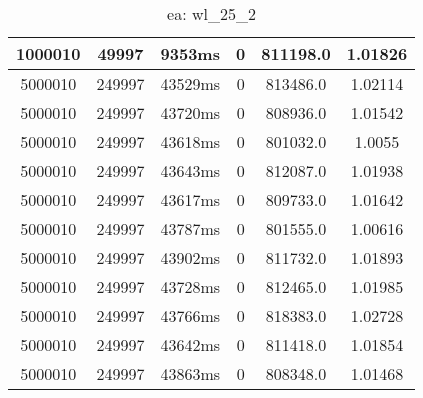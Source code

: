 \documentclass[./main.tex]{subfiles}
\begin{document}
\begin{table}
\begin{tabular}{ c | c | c | c | c | c }
        \rowcolor{lightgray} 1000010 & 49997 & 9353ms & 0 & 811198.0 & 1.01826 \\
        \hline
        5000010 & 249997 & 43529ms & 0 & 813486.0 & 1.02114 \\
        5000010 & 249997 & 43720ms & 0 & 808936.0 & 1.01542 \\
        5000010 & 249997 & 43618ms & 0 & 801032.0 & 1.0055 \\
        5000010 & 249997 & 43643ms & 0 & 812087.0 & 1.01938 \\
        5000010 & 249997 & 43617ms & 0 & 809733.0 & 1.01642 \\
        5000010 & 249997 & 43787ms & 0 & 801555.0 & 1.00616 \\
        5000010 & 249997 & 43902ms & 0 & 811732.0 & 1.01893 \\
        5000010 & 249997 & 43728ms & 0 & 812465.0 & 1.01985 \\
        5000010 & 249997 & 43766ms & 0 & 818383.0 & 1.02728 \\
        \rowcolor{lightgray} 5000010 & 249997 & 43642ms & 0 & 811418.0 & 1.01854 \\
        5000010 & 249997 & 43863ms & 0 & 808348.0 & 1.01468 \\
    \end{tabular}
    \caption{ea: wl\_25\_2}
\end{table}
\end{document}
